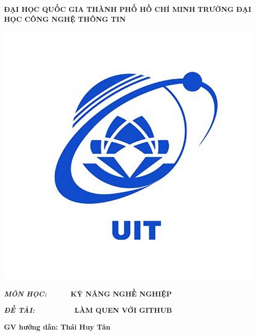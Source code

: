 \documentclass[a4paper]{report}
\begin{document}
\begin{titlepage}
\begin{center}
    \vspace{5pt}
    \textbf{ĐẠI HỌC QUỐC GIA THÀNH PHỐ HỒ CHÍ MINH}
    \vspace{5pt}
    \textbf{TRƯỜNG ĐẠI HỌC CÔNG NGHỆ THÔNG TIN}
\end{center}

\vspace{5pt}

\begin{center}
    \includegraphics[scale=0.3]{UIT.jpg}
    \vspace{10pt}
    \fontsize{15pt}{15pt}\selectfont

    \begin{flushleft}
    \fontsize{15pt}{15pt}\selectfont  
    \textbf{\textsl{MÔN HỌC:}~~~~~~{KỸ NĂNG NGHỀ NGHIỆP}}
    \end{flushleft}
\end{center}


\begin{flushleft}
    \fontsize{15pt}{15pt}\selectfont  
    \textbf{\textsl{ĐỀ TÀI:}~~~~~~~~~~{LÀM QUEN VỚI GITHUB}}
\end{flushleft}


\vspace{15pt}
\textbf{GV hướng dẫn: Thái Huy Tân}


\end{titlepage}
\end{document}
